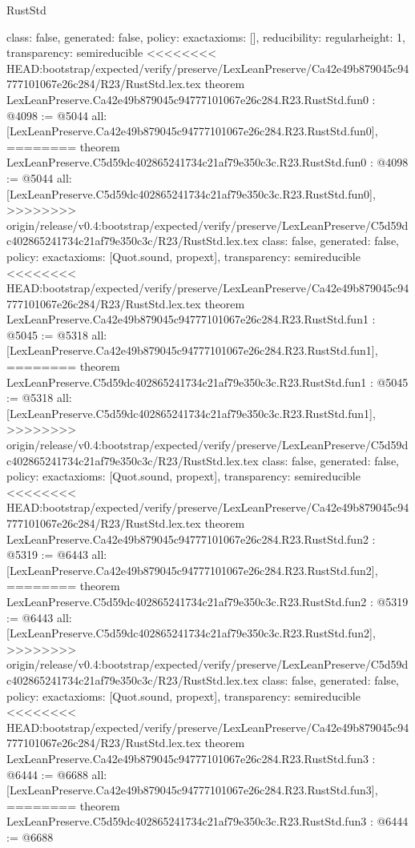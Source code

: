 \begin{lexlean}{RustStd}
\begin{coremodule}
{\begin{coremodule}
{{{  class: false,
  generated: false,
  policy: exact{axioms: []},
  reducibility: regular{height: 1},
  transparency: semireducible
}
<<<<<<<< HEAD:bootstrap/expected/verify/preserve/LexLeanPreserve/Ca42e49b879045c94777101067e26c284/R23/RustStd.lex.tex
theorem LexLeanPreserve.Ca42e49b879045c94777101067e26c284.R23.RustStd.fun0 : @4098 := @5044 {
  all: [LexLeanPreserve.Ca42e49b879045c94777101067e26c284.R23.RustStd.fun0],
========
theorem LexLeanPreserve.C5d59dc402865241734c21af79e350c3c.R23.RustStd.fun0 : @4098 := @5044 {
  all: [LexLeanPreserve.C5d59dc402865241734c21af79e350c3c.R23.RustStd.fun0],
>>>>>>>> origin/release/v0.4:bootstrap/expected/verify/preserve/LexLeanPreserve/C5d59dc402865241734c21af79e350c3c/R23/RustStd.lex.tex
  class: false,
  generated: false,
  policy: exact{axioms: [Quot.sound, propext]},
  transparency: semireducible
}
<<<<<<<< HEAD:bootstrap/expected/verify/preserve/LexLeanPreserve/Ca42e49b879045c94777101067e26c284/R23/RustStd.lex.tex
theorem LexLeanPreserve.Ca42e49b879045c94777101067e26c284.R23.RustStd.fun1 : @5045 := @5318 {
  all: [LexLeanPreserve.Ca42e49b879045c94777101067e26c284.R23.RustStd.fun1],
========
theorem LexLeanPreserve.C5d59dc402865241734c21af79e350c3c.R23.RustStd.fun1 : @5045 := @5318 {
  all: [LexLeanPreserve.C5d59dc402865241734c21af79e350c3c.R23.RustStd.fun1],
>>>>>>>> origin/release/v0.4:bootstrap/expected/verify/preserve/LexLeanPreserve/C5d59dc402865241734c21af79e350c3c/R23/RustStd.lex.tex
  class: false,
  generated: false,
  policy: exact{axioms: [Quot.sound, propext]},
  transparency: semireducible
}
<<<<<<<< HEAD:bootstrap/expected/verify/preserve/LexLeanPreserve/Ca42e49b879045c94777101067e26c284/R23/RustStd.lex.tex
theorem LexLeanPreserve.Ca42e49b879045c94777101067e26c284.R23.RustStd.fun2 : @5319 := @6443 {
  all: [LexLeanPreserve.Ca42e49b879045c94777101067e26c284.R23.RustStd.fun2],
========
theorem LexLeanPreserve.C5d59dc402865241734c21af79e350c3c.R23.RustStd.fun2 : @5319 := @6443 {
  all: [LexLeanPreserve.C5d59dc402865241734c21af79e350c3c.R23.RustStd.fun2],
>>>>>>>> origin/release/v0.4:bootstrap/expected/verify/preserve/LexLeanPreserve/C5d59dc402865241734c21af79e350c3c/R23/RustStd.lex.tex
  class: false,
  generated: false,
  policy: exact{axioms: [Quot.sound, propext]},
  transparency: semireducible
}
<<<<<<<< HEAD:bootstrap/expected/verify/preserve/LexLeanPreserve/Ca42e49b879045c94777101067e26c284/R23/RustStd.lex.tex
theorem LexLeanPreserve.Ca42e49b879045c94777101067e26c284.R23.RustStd.fun3 : @6444 := @6688 {
  all: [LexLeanPreserve.Ca42e49b879045c94777101067e26c284.R23.RustStd.fun3],
========
theorem LexLeanPreserve.C5d59dc402865241734c21af79e350c3c.R23.RustStd.fun3 : @6444 := @6688 {
}}}}}}}
\end{coremodule}}
\end{coremodule}
\end{lexlean}
